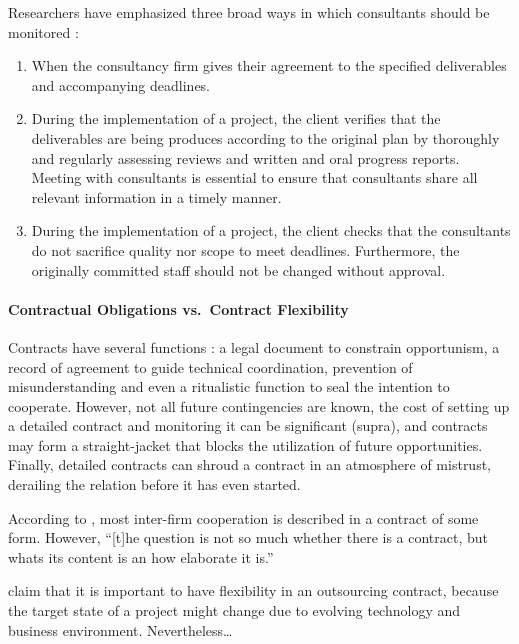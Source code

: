 \documentclass[12pt]{article}
\providecommand{\tightlist}{%
  \setlength{\itemsep}{0pt}\setlength{\parskip}{0pt}}
\begin{document}
Researchers have emphasized three broad ways in which consultants should
be monitored \citep[ 15]{basu2011}:

\begin{enumerate}
\def\labelenumi{\arabic{enumi}.}
\tightlist
\item
  When the consultancy firm gives their agreement to the specified
  deliverables and accompanying deadlines.
\item
  During the implementation of a project, the client verifies that the
  deliverables are being produces according to the original plan by
  thoroughly and regularly assessing reviews and written and oral
  progress reports. Meeting with consultants is essential to ensure that
  consultants share all relevant information in a timely manner.
\item
  During the implementation of a project, the client checks that the
  consultants do not sacrifice quality nor scope to meet deadlines.
  Furthermore, the originally committed staff should not be changed
  without approval.
\end{enumerate}

\citet{nooteboom2000}

\hypertarget{contractual-obligations-vs.-contract-flexibility}{%
\paragraph{Contractual Obligations vs.~Contract
Flexibility}\label{contractual-obligations-vs.-contract-flexibility}}

Contracts have several functions \citep[ 924]{noteboom1996}: a legal
document to constrain opportunism, a record of agreement to guide
technical coordination, prevention of misunderstanding and even a
ritualistic function to seal the intention to cooperate. However, not
all future contingencies are known, the cost of setting up a detailed
contract and monitoring it can be significant (supra), and contracts may
form a straight-jacket that blocks the utilization of future
opportunities. Finally, detailed contracts can shroud a contract in an
atmosphere of mistrust, derailing the relation before it has even
started.

According to \citet[924]{nooteboom1996}, most inter-firm cooperation is
described in a contract of some form. However, ``{[}t{]}he question is
not so much whether there is a contract, but whats its content is an how
elaborate it is.''

\citet{mcfarlan1995} claim that it is important to have flexibility in
an outsourcing contract, because the target state of a project might
change due to evolving technology and business environment.
Nevertheless\ldots{}
\end{document}
